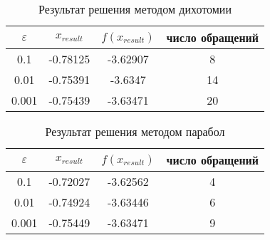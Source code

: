 \documentclass[../body.tex]{subfiles}
\begin{document}
\begin{table}[h]
    \centering
    \begin{tabular}{|c|c|c|c|}
        \hline
        $\varepsilon$ & $x_{result}$ & $f(x_{result})$ & число обращений\\\hline
        0.1 & -0.78125 & -3.62907 & 8\\\hline
        0.01 & -0.75391 & -3.6347 & 14\\\hline
        0.001 & -0.75439 & -3.63471 & 20\\\hline
    \end{tabular}
    \caption{Результат решения методом дихотомии}
    \label{tab:dichotomy}
\end{table}

\begin{table}[h]
    \centering
    \begin{tabular}{|c|c|c|c|}
        \hline
        $\varepsilon$ & $x_{result}$ & $f(x_{result})$ & число обращений\\\hline
        0.1 & -0.72027 & -3.62562 & 4\\\hline
        0.01 & -0.74924 & -3.63446 & 6\\\hline
        0.001 & -0.75449 & -3.63471 & 9\\\hline
    \end{tabular}
    \caption{Результат решения методом парабол}
    \label{tab:polynomial}
\end{table}
\end{document}
